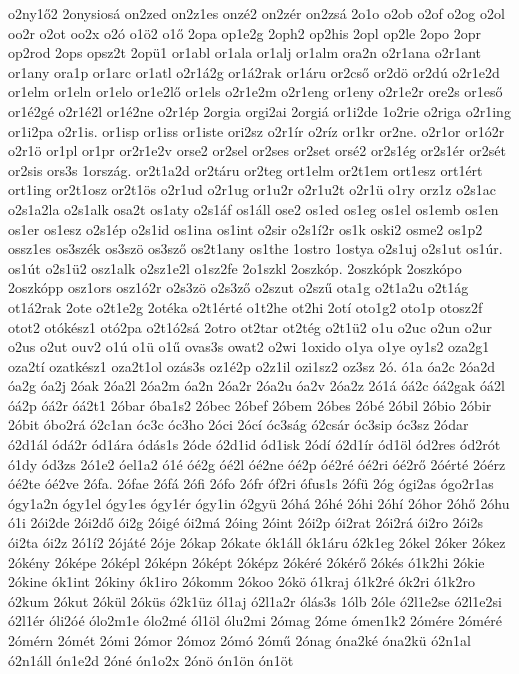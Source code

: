 {o2ny1ő2
2onysiosá
on2zed
on2z1es
onzé2
on2zér
on2zsá
2o1o
o2ob
o2of
o2og
o2ol
oo2r
o2ot
oo2x
o2ó
o1ö2
o1ő
2opa
op1e2g
2oph2
op2his
2opl
op2le
2opo
2opr
op2rod
2ops
opsz2t
2opü1
or1abl
or1ala
or1alj
or1alm
ora2n
o2r1ana
o2r1ant
or1any
ora1p
or1arc
or1atl
o2r1á2g
or1á2rak
or1áru
or2cső
or2dö
or2dú
o2r1e2d
or1elm
or1eln
or1elo
or1e2lő
or1els
o2r1e2m
o2r1eng
or1eny
o2r1e2r
ore2s
or1eső
or1é2gé
o2r1é2l
or1é2ne
o2r1ép
2orgia
orgi2ai
2orgiá
or1i2de
1o2rie
o2riga
o2r1ing
or1i2pa
o2r1is.
or1isp
or1iss
or1iste
ori2sz
o2r1ír
o2ríz
or1kr
or2ne.
o2r1or
or1ó2r
o2r1ö
or1pl
or1pr
or2r1e2v
orse2
or2sel
or2ses
or2set
orsé2
or2s1ég
or2s1ér
or2sét
or2sis
ors3s
1ország.
or2t1a2d
or2táru
or2teg
ort1elm
or2t1em
ort1esz
ort1ért
ort1ing
or2t1osz
or2t1ös
o2r1ud
o2r1ug
or1u2r
o2r1u2t
o2r1ü
o1ry
orz1z
o2s1ac
o2s1a2la
o2s1alk
osa2t
os1aty
o2s1áf
os1áll
ose2
os1ed
os1eg
os1el
os1emb
os1en
os1er
os1esz
o2s1ép
o2s1id
os1ina
os1int
o2sir
o2s1í2r
os1k
oski2
osme2
os1p2
ossz1es
os3szék
os3szö
os3sző
os2t1any
os1the
1ostro
1ostya
o2s1uj
o2s1ut
os1úr.
os1út
o2s1ü2
osz1alk
o2sz1e2l
o1sz2fe
2o1szkl
2oszkóp.
2oszkópk
2oszkópo
2oszkópp
osz1ors
osz1ó2r
o2s3zö
o2s3ző
o2szut
o2szű
ota1g
o2t1a2u
o2t1ág
ot1á2rak
2ote
o2t1e2g
2otéka
o2t1érté
o1t2he
ot2hi
2otí
oto1g2
oto1p
otosz2f
otot2
otókész1
otó2pa
o2t1ó2sá
2otro
ot2tar
ot2tég
o2t1ü2
o1u
o2uc
o2un
o2ur
o2us
o2ut
ouv2
o1ú
o1ü
o1ű
ovas3s
owat2
o2wi
1oxido
o1ya
o1ye
oy1s2
oza2g1
oza2tí
ozatkész1
oza2t1ol
ozás3s
oz1é2p
o2z1il
ozi1sz2
oz3sz
2ó.
ó1a
óa2c
2óa2d
óa2g
óa2j
2óak
2óa2l
2óa2m
óa2n
2óa2r
2óa2u
óa2v
2óa2z
2ó1á
óá2c
óá2gak
óá2l
óá2p
óá2r
óá2t1
2óbar
óba1s2
2óbec
2óbef
2óbem
2óbes
2óbé
2óbil
2óbio
2óbir
2óbit
óbo2rá
ó2c1an
óc3c
óc3ho
2óci
2ócí
óc3ság
ó2csár
óc3sip
óc3sz
2ódar
ó2d1ál
ódá2r
ód1ára
ódás1s
2óde
ó2d1id
ód1isk
2ódí
ó2d1ír
ód1öl
ód2res
ód2rót
ó1dy
ód3zs
2ó1e2
óel1a2
ó1é
óé2g
óé2l
óé2ne
óé2p
óé2ré
óé2ri
óé2rő
2óérté
2óérz
óé2te
óé2ve
2ófa.
2ófae
2ófá
2ófi
2ófo
2ófr
óf2ri
ófus1s
2ófü
2óg
ógi2as
ógo2r1as
ógy1a2n
ógy1el
ógy1es
ógy1ér
ógy1in
ó2gyü
2óhá
2óhé
2óhi
2óhí
2óhor
2óhő
2óhu
ó1i
2ói2de
2ói2dő
ói2g
2óigé
ói2má
2óing
2óint
2ói2p
ói2rat
2ói2rá
ói2ro
2ói2s
ói2ta
ói2z
2ó1í2
2ójáté
2óje
2ókap
2ókate
ók1áll
ók1áru
ó2k1eg
2ókel
2óker
2ókez
2ókény
2óképe
2óképl
2óképn
2óképt
2óképz
2ókéré
2ókérő
2ókés
ó1k2hi
2ókie
2ókine
ók1int
2ókiny
ók1iro
2ókomm
2ókoo
2ókö
ó1kraj
ó1k2ré
ók2ri
ó1k2ro
ó2kum
2ókut
2ókül
2óküs
ó2k1üz
ól1aj
ó2l1a2r
ólás3s
1ólb
2óle
ó2l1e2se
ó2l1e2si
ó2l1ér
óli2óé
ólo2m1e
ólo2mé
ól1öl
ólu2mi
2ómag
2óme
ómen1k2
2ómére
2óméré
2ómérn
2ómét
2ómi
2ómor
2ómoz
2ómó
2ómű
2ónag
óna2ké
óna2kü
ó2n1al
ó2n1áll
ón1e2d
2óné
ón1o2x
2ónö
ón1ön
ón1öt
}
